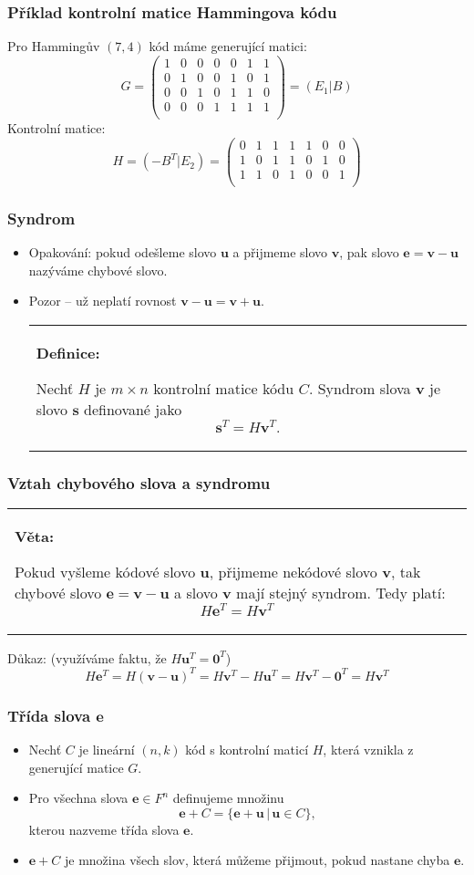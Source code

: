 \documentclass{beamer}
\newenvironment{definice}
{
    \begin{center}
    \begin{tabular}{p{9cm}}
    \textbf{Definice:}
}
{
    \end{tabular}
    \end{center}
}
\newenvironment{veta}
{
    \begin{center}
    \begin{tabular}{p{9cm}}
    \textbf{Věta:}
}
{
    \end{tabular}
    \end{center}
}
\newcommand{\sep}{\,|\,}
\newcommand{\vu}{\textbf{u}}
\newcommand{\vv}{\textbf{v}}
\newcommand{\e}{\textbf{e}}
\newcommand{\s}{\textbf{s}}
\newcommand{\zero}{\textbf{0}}
\newenvironment{itemizex}%
  {\large \begin{itemize}%
    \setlength{\itemsep}{8pt}%
    \setlength{\parskip}{8pt}}%
  {\end{itemize}}
\begin{document}
\begin{frame}[t,fragile]\frametitle{Příklad kontrolní matice Hammingova kódu} 
Pro Hammingův $(7,4)$ kód máme generující matici:
$$
G=
\begin{pmatrix}
1&0&0&0&0&1&1\\
0&1&0&0&1&0&1\\
0&0&1&0&1&1&0\\
0&0&0&1&1&1&1\\
\end{pmatrix}
=
(E_1|B)
$$
Kontrolní matice:
$$
H=(-B^T|E_2)=
\begin{pmatrix}
0&1&1&1&1&0&0\\
1&0&1&1&0&1&0\\
1&1&0&1&0&0&1\\
\end{pmatrix}
$$
\end{frame}


\begin{frame}[t,fragile]\frametitle{Syndrom} 
    \begin{itemizex}
        \item Opakování: pokud odešleme slovo $\vu$ a přijmeme slovo $\vv$, pak slovo $\e=\vv-\vu$ nazýváme chybové slovo.
        \item Pozor -- už neplatí rovnost $\vv-\vu=\vv+\vu$.

        \begin{definice}
    Nechť $H$ je $m\times n$ kontrolní matice kódu $C$. Syndrom slova $\vv$ je slovo $\s$ definované jako 
    $$
\s^T=H\vv^T.
    $$\end{definice}

    \end{itemizex}
\end{frame}


\begin{frame}[t,fragile]\frametitle{Vztah chybového slova a syndromu} 
\begin{veta}
Pokud vyšleme kódové slovo $\vu$, přijmeme nekódové slovo $\vv$, tak chybové slovo $\e=\vv-\vu$ a slovo $\vv$ mají stejný syndrom. Tedy platí:
$$
H\e^T=H\vv^T
$$
\end{veta}

Důkaz: (využíváme faktu, že $H\vu^T=\zero^T$)
$$
H\e^T=H(\vv-\vu)^T=H\vv^T-H\vu^T=H\vv^T-\zero^T=H\vv^T
$$
\end{frame}



\begin{frame}[t,fragile]\frametitle{Třída slova $\e$} 
    \begin{itemizex}
        \item Nechť $C$ je lineární $(n,k)$ kód s kontrolní maticí $H$, která vznikla z generující matice $G$.
        \item Pro všechna slova $\e\in F^n$ definujeme množinu
        $$
        \e+C=\{\e+\vu\sep\vu\in C\},
        $$
        kterou nazveme třída slova $\e$.
        \item $\e+C$ je množina všech slov, která můžeme přijmout, pokud nastane chyba $\e$.
    \end{itemizex}
\end{frame}
\end{document}
